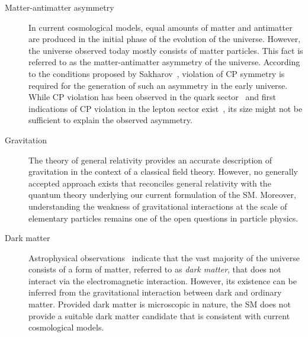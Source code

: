 \begin{description}

\item[Matter-antimatter asymmetry] In current cosmological models, equal amounts
  of matter and antimatter are produced in the initial phase of the evolution of
  the universe. However, the universe observed today mostly consists of matter
  particles. This fact is referred to as the matter-antimatter asymmetry of the
  universe. According to the conditions proposed by
  Sakharov~\cite{Sakharov:1967dj}, violation of CP symmetry is required for the
  generation of such an asymmetry in the early universe. While CP violation has
  been observed in the quark sector~\cite{Christenson:1964fg} and first
  indications of CP violation in the lepton sector exist~\cite{T2K:2019bcf}, its
  size might not be sufficient to explain the observed asymmetry.

\item[Gravitation] The theory of general relativity provides an accurate
  description of gravitation in the context of a classical field
  theory. However, no generally accepted approach exists that reconciles general
  relativity with the quantum theory underlying our current formulation of the
  SM. Moreover, understanding the weakness of gravitational interactions at the
  scale of elementary particles remains one of the open questions in particle
  physics.

\item[Dark matter] Astrophysical
  observations~\cite{Zwicky:1933gu,Zwicky:1937zza,Rubin:1970zza,Rubin:1980zd,Clowe:2006eq}
  indicate that the vast majority of the universe consists of a form of matter,
  referred to as \emph{dark matter}, that does not interact via the
  electromagnetic interaction. However, its existence can be inferred from the
  gravitational interaction between dark and ordinary matter. Provided dark
  matter is microscopic in nature, the SM does not provide a suitable dark
  matter candidate that is consistent with current cosmological models.


\end{description}
